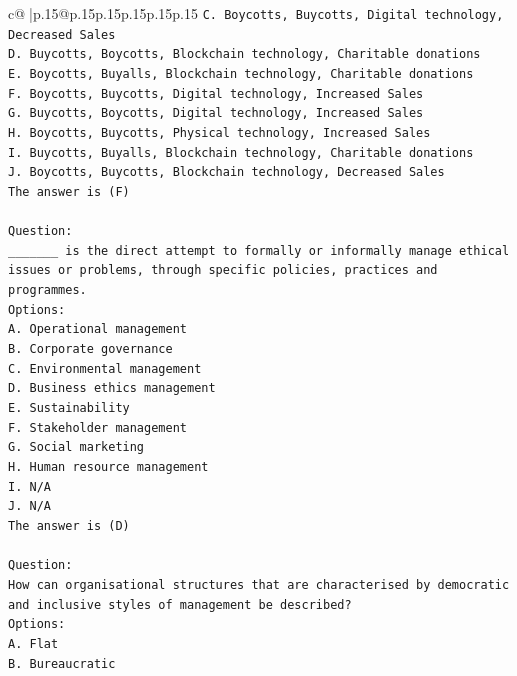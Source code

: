 \documentclass{article}
\begin{document}
{\begin{supertabular}{c@{$\;$}|p{.15\linewidth}@{}p{.15\linewidth}p{.15\linewidth}p{.15\linewidth}p{.15\linewidth}p{.15\linewidth}}
{{{\texttt{C. Boycotts, Buycotts, Digital technology, Decreased Sales} \\
\texttt{D. Buycotts, Boycotts, Blockchain technology, Charitable donations} \\
\texttt{E. Boycotts, Buyalls, Blockchain technology, Charitable donations} \\
\texttt{F. Boycotts, Buycotts, Digital technology, Increased Sales} \\
\texttt{G. Buycotts, Boycotts, Digital technology, Increased Sales} \\
\texttt{H. Boycotts, Buycotts, Physical technology, Increased Sales} \\
\texttt{I. Buycotts, Buyalls, Blockchain technology, Charitable donations} \\
\texttt{J. Boycotts, Buycotts, Blockchain technology, Decreased Sales} \\
\texttt{The answer is (F)} \\
\\ 
\texttt{Question:} \\
\texttt{\_\_\_\_\_\_\_ is the direct attempt to formally or informally manage ethical issues or problems, through specific policies, practices and programmes.} \\
\texttt{Options:} \\
\texttt{A. Operational management} \\
\texttt{B. Corporate governance} \\
\texttt{C. Environmental management} \\
\texttt{D. Business ethics management} \\
\texttt{E. Sustainability} \\
\texttt{F. Stakeholder management} \\
\texttt{G. Social marketing} \\
\texttt{H. Human resource management} \\
\texttt{I. N/A} \\
\texttt{J. N/A} \\
\texttt{The answer is (D)} \\
\\ 
\texttt{Question:} \\
\texttt{How can organisational structures that are characterised by democratic and inclusive styles of management be described?} \\
\texttt{Options:} \\
\texttt{A. Flat} \\
\texttt{B. Bureaucratic} \\
}}}
\end{supertabular}}
\end{document}
